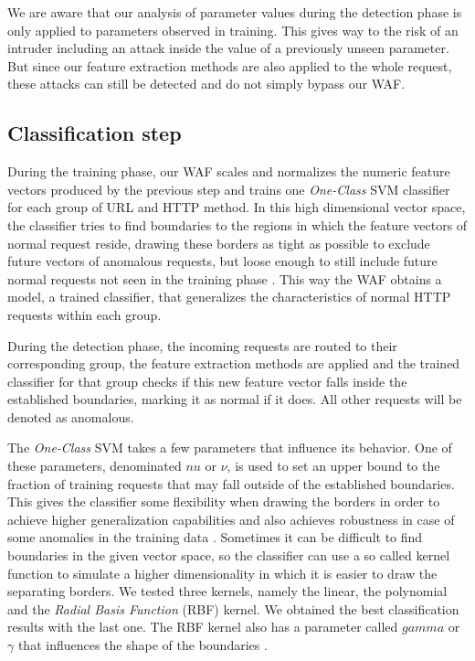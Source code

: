We are aware that our analysis of parameter values during the detection
phase is only applied to parameters observed in training.
This gives way to the risk of an intruder including an attack inside the
value of a previously unseen parameter.
But since our feature extraction methods are also applied to the whole
request, these attacks can still be detected and do not simply bypass
our WAF.


\subsection{Classification step}

During the training phase, our WAF scales and normalizes the numeric feature
vectors produced by the previous step and trains one \textit{One-Class} SVM
classifier for each group of URL and HTTP method.
In this high dimensional vector space, the classifier tries to find boundaries
to the regions in which the feature vectors of normal request reside,
drawing these borders as tight as possible to exclude future vectors of
anomalous requests, but loose enough to still include future normal requests
not seen in the training phase \cite{perdisci2006using}.
This way the WAF obtains a model, a trained classifier, that generalizes
the characteristics of normal HTTP requests within each group.

During the detection phase, the incoming requests are routed to their
corresponding group, the feature extraction methods are applied and the
trained classifier for that group checks if this new feature vector
falls inside the established boundaries, marking it as normal if it does.
All other requests will be denoted as anomalous.

The \textit{One-Class} SVM takes a few parameters that influence its
behavior.
One of these parameters, denominated $nu$ or $\nu$, is used to set an upper
bound to the fraction of training requests that may fall outside of the
established boundaries. This gives the classifier some flexibility when
drawing the borders in order to achieve higher generalization capabilities
and also achieves robustness in case of some anomalies in the training
data \cite{scholkopf2001estimating}.
Sometimes it can be difficult to find boundaries in the given vector space,
so the classifier can use a so called kernel function to simulate a
higher dimensionality in which it is easier to draw the separating borders.
We tested three kernels, namely the linear, the polynomial and the
\textit{Radial Basis Function} (RBF) kernel. We obtained the best
classification results with the last one.
The RBF kernel also has a parameter called $gamma$ or $\gamma$ that
influences the shape of the boundaries \cite{tran2004one}.



